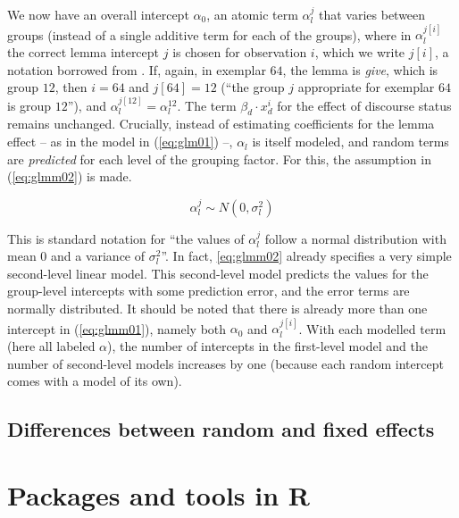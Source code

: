 \documentclass[a4paper,12pt]{article}
\begin{document}
We now have an overall intercept $\alpha_0$, an atomic term $\alpha_l^j$ that varies between groups (instead of a single additive term for each of the groups), where in $\alpha_l^{j[i]}$ the correct lemma intercept $j$ is chosen for observation $i$, which we write $j[i]$, a notation borrowed from \citet{GelmanHill2006}.
If, again, in exemplar $64$, the lemma is \textit{give}, which is group $12$, then $i=64$ and $j[64]=12$ (``the group $j$ appropriate for exemplar $64$ is group $12$''), and $\alpha_l^{j[12]}=\alpha_l^{12}$.
The term $\beta_d\cdot x_d^i$ for the effect of discourse status remains unchanged.
Crucially, instead of estimating coefficients for the lemma effect -- as in the model in (\ref{eq:glm01}) --, $\alpha_l$ is itself modeled, and random terms are \textit{predicted} for each level of the grouping factor.
For this, the assumption in (\ref{eq:glmm02}) is made.

\begin{equation}
  \alpha_l^j\sim N(0,\sigma_l^2)
  \label{eq:glmm02}
\end{equation}

This is standard notation for ``the values of $\alpha_l^j$ follow a normal distribution with mean $0$ and a variance of $\sigma_l^2$''.
In fact, \ref{eq:glmm02} already specifies a very simple second-level linear model.
This second-level model predicts the values for the group-level intercepts with some prediction error, and the error terms are normally distributed.
It should be noted that there is already more than one intercept in (\ref{eq:glmm01}), namely both $\alpha_0$ and $\alpha_{l}^{j[i]}$.
With each modelled term (here all labeled $\alpha$), the number of intercepts in the first-level model and the number of second-level models increases by one (because each random intercept comes with a model of its own).

\subsection{Differences between random and fixed effects}
\label{sec:differencesbetweenrandomandfixedeffects}





\section{Packages and tools in R}
\label{sec:estimationofhierarchicalmodelsinr}
\end{document}
